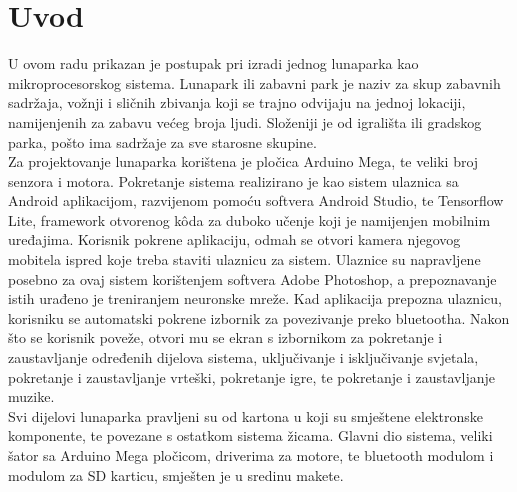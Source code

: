 \chapter{Uvod}

U ovom radu prikazan je postupak pri izradi jednog lunaparka kao mikroprocesorskog sistema. Lunapark ili zabavni park je naziv za skup zabavnih sadržaja, vožnji i sličnih zbivanja koji se trajno odvijaju na jednoj lokaciji, namijenjenih za zabavu većeg broja ljudi. Složeniji je od igrališta ili gradskog parka, pošto ima sadržaje za sve starosne skupine.  \\

Za projektovanje lunaparka korištena je pločica Arduino Mega, te veliki broj senzora i motora. Pokretanje sistema realizirano je kao sistem ulaznica sa Android aplikacijom, razvijenom pomoću softvera Android Studio, te Tensorflow Lite, framework otvorenog kôda za duboko učenje koji je namijenjen mobilnim uređajima. Korisnik pokrene aplikaciju, odmah se otvori kamera njegovog mobitela ispred koje treba staviti ulaznicu za sistem. Ulaznice su napravljene posebno za ovaj sistem korištenjem softvera Adobe Photoshop, a prepoznavanje istih urađeno je treniranjem neuronske mreže. Kad aplikacija prepozna ulaznicu, korisniku se automatski pokrene izbornik za povezivanje preko bluetootha. Nakon što se korisnik poveže, otvori mu se ekran s izbornikom za pokretanje i zaustavljanje određenih dijelova sistema, uključivanje i isključivanje svjetala, pokretanje i zaustavljanje vrteški, pokretanje igre, te pokretanje i zaustavljanje muzike. \\

Svi dijelovi lunaparka pravljeni su od kartona u koji su smještene elektronske komponente, te povezane s ostatkom sistema žicama. Glavni dio sistema, veliki šator sa Arduino Mega pločicom, driverima za motore, te bluetooth modulom i modulom za SD karticu, smješten je u sredinu makete. 